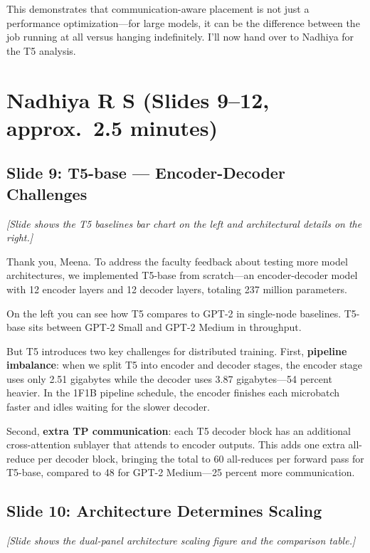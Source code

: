 \documentclass[11pt, a4paper]{article}
\begin{document}
This demonstrates that communication-aware placement is not just a performance optimization---for large models, it can be the difference between the job running at all versus hanging indefinitely. I'll now hand over to Nadhiya for the T5 analysis.

\section{Nadhiya R S (Slides 9--12, approx.\ 2.5 minutes)}

\subsection{Slide 9: T5-base --- Encoder-Decoder Challenges}
\textit{[Slide shows the T5 baselines bar chart on the left and architectural details on the right.]}

Thank you, Meena. To address the faculty feedback about testing more model architectures, we implemented T5-base from scratch---an encoder-decoder model with 12 encoder layers and 12 decoder layers, totaling 237 million parameters.

On the left you can see how T5 compares to GPT-2 in single-node baselines. T5-base sits between GPT-2 Small and GPT-2 Medium in throughput.

But T5 introduces two key challenges for distributed training. First, \textbf{pipeline imbalance}: when we split T5 into encoder and decoder stages, the encoder stage uses only 2.51 gigabytes while the decoder uses 3.87 gigabytes---54 percent heavier. In the 1F1B pipeline schedule, the encoder finishes each microbatch faster and idles waiting for the slower decoder.

Second, \textbf{extra TP communication}: each T5 decoder block has an additional cross-attention sublayer that attends to encoder outputs. This adds one extra all-reduce per decoder block, bringing the total to 60 all-reduces per forward pass for T5-base, compared to 48 for GPT-2 Medium---25 percent more communication.

\subsection{Slide 10: Architecture Determines Scaling}
\textit{[Slide shows the dual-panel architecture scaling figure and the comparison table.]}
\end{document}
